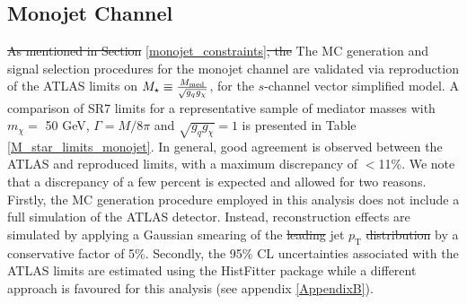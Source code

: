 \subsection{Monojet Channel}
\label{monojet_validation}
\begin{flushleft}
\st{As mentioned in Section }\ref{monojet_constraints}\st{, the} The MC generation and signal selection procedures for the monojet channel are validated via reproduction of the ATLAS limits on $M_{\star} \equiv \frac{M_{\mathrm{med}}}{\sqrt{g_q g_{\chi}}}$, for the $s$-channel vector simplified model. A comparison of SR7 limits for a representative sample of mediator masses with $m_{\chi} = $ 50 GeV, $\Gamma = M/8\pi$ and $\sqrt{g_{q}g_{\chi}} = 1$ is presented in Table \ref{M_star_limits_monojet}. In general, good agreement is observed between the ATLAS and reproduced limits, with a maximum discrepancy of $<$11\%. We note that a discrepancy of a few percent is expected and allowed for two reasons. Firstly, the MC generation procedure employed in this analysis does not include a full simulation of the ATLAS detector. Instead, reconstruction effects are simulated by applying a Gaussian smearing of the \st{leading} jet $p_{\mathrm{T}}$ \st{distribution} by a conservative factor of 5\%. Secondly, the 95\% CL uncertainties associated with the ATLAS limits are estimated using the HistFitter package while a different approach is favoured for this analysis (see appendix \ref{AppendixB}). 




\end{flushleft}
